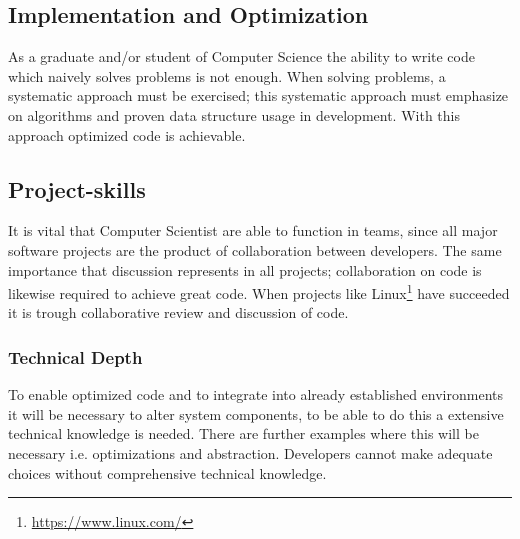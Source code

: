 \documentclass[11pt,a4paper]{article}
\theoremstyle{plain}
\theoremstyle{definition}
\theoremstyle{remark}
\numberwithin{equation}{section}
\begin{document}
\subsection{Implementation and Optimization}

As a graduate and/or student of Computer Science the ability to write code which naively solves problems is not enough. When solving problems, a systematic approach must be exercised; this systematic approach must emphasize on algorithms and proven data structure usage in development. With this approach optimized code is achievable.

\subsection{Project-skills}

It is vital that Computer Scientist are able to function in teams, since all major software projects are the product of collaboration between developers. The same importance that discussion represents in all projects; collaboration on code is likewise required to achieve great code. When projects like Linux\footnote{ \url{https://www.linux.com/}} have succeeded it is trough collaborative review and discussion of code.

\subsubsection{Technical Depth}

To enable optimized code and to integrate into already established environments it will be necessary to alter system components, to be able to do this a extensive technical knowledge is needed. There are further examples where this will be necessary i.e. optimizations and abstraction. Developers cannot make adequate choices without comprehensive technical knowledge.


\newpage


\end{document}
